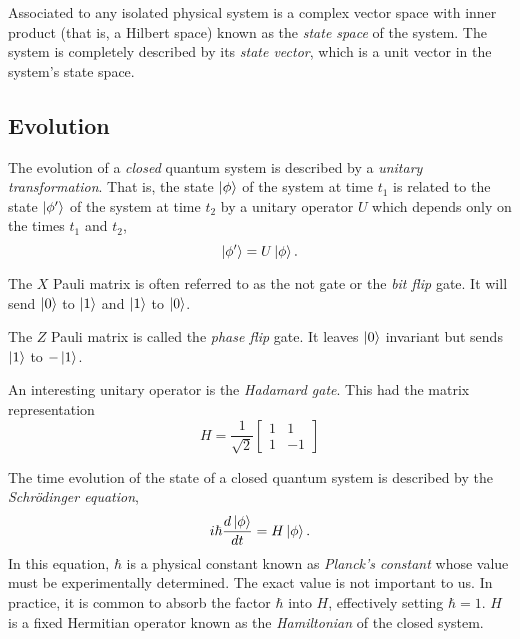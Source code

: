\documentclass{article}
\begin{document}
\begin{postulate}
  Associated to any isolated physical system is a complex vector space with inner product (that is, a Hilbert space) known as the \textit{state space} of the system. The system is completely described by its \textit{state vector}, which is a unit vector in the system's state space.
\end{postulate}

\subsection{Evolution}

\begin{postulate}
  The evolution of a \textit{closed} quantum system is described by a \textit{unitary transformation}. That is, the state $\ket{\phi}$ of the system at time $t_1$ is related to the state $\ket{\phi'}$ of the system at time $t_2$ by a unitary operator $U$ which depends only on the times $t_1$ and $t_2$,
  \[\ket{\phi'}=U\ket{\phi}.\]
\end{postulate}

The $X$ Pauli matrix is often referred to as the not gate or the \textit{bit flip} gate. It will send $\ket0$ to $\ket1$ and $\ket1$ to $\ket0$.

The $Z$ Pauli matrix is called the \textit{phase flip} gate. It leaves $\ket0$ invariant but sends $\ket1$ to $-\ket1$.

\begin{definition}
  An interesting unitary operator is the \textit{Hadamard gate}. This had the matrix representation
  \[H=\frac{1}{\sqrt2}
  \begin{bmatrix}
    1&1 \\
    1&-1
  \end{bmatrix}\]
\end{definition}

\setcounter{postulate}{1}

\begin{postulate}[Revised]
  The time evolution of the state of a closed quantum system is described by the \textit{Schr\"odinger equation},
  \[i\hbar\frac{d\ket\phi}{dt}=H\ket\phi.\]
  In this equation, $\hbar$ is a physical constant known as \textit{Planck's constant} whose value must be experimentally determined. The exact value is not important to us. In practice, it is common to absorb the factor $\hbar$ into $H$, effectively setting $\hbar=1$. $H$ is a fixed Hermitian operator known as the \textit{Hamiltonian} of the closed system.
\end{postulate}
\end{document}
